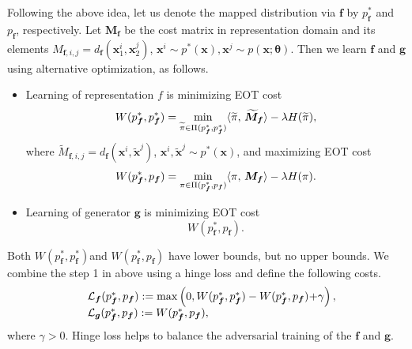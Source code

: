 Following the above idea, let us denote the mapped distribution via $\bm{f}$ by $p^{\ast}_{\bm{f}}$ and $p_{\bm{f}}$, respectively. Let $\bm{M}_{\bm{f}}$ be the cost matrix in representation domain and its elements $M_{\bm{f},{i,j}} = d_{\bm{f}}(\bm{x}^{i}_1, \bm{x}^{j}_2)$, $\bm{x}^{i} \sim p^{\ast}(\bm{x}), \bm{x}^{j}\sim p(\bm{x}; \bm{\theta})$. Then we learn $\bm{f}$ and $\bm{g}$ using alternative optimization, as follows. 
\begin{itemize}
\item Learning of representation $f$ is minimizing EOT cost
  \begin{equation}\label{eq-sim-in}
    W(p^{\ast}_{\bm{f}},p^{\ast}_{\bm{f}}) = \min_{\widetilde{\pi} \in \Pi(p^{\ast}_{\bm{f}}, p^{\ast}_{\bm{f}}) } \langle \widetilde{\pi},\,\widetilde{\bm{M}}_{\bm{f}}\rangle - \lambda H(\widetilde{\pi}),
  \end{equation}
  where $\widetilde{M}_{\bm{f}, {i,j}} = d_{\bm{f}}(\bm{x}^{i}, \tilde{\bm{x}}^{j})$, $\bm{x}^{i}, \tilde{\bm{x}}^{j} \sim p^{\ast}(\bm{x})$, and maximizing EOT cost
  \begin{equation}\label{eq-sim-ex}
    W(p^{\ast}_{\bm{f}}, p_{\bm{f}}) = \min_{{\pi} \in \Pi(p^{\ast}_{\bm{f}}, p_{\bm{f}}) } \dotp{{\pi}}{\bm{M_f}} - \la H({\pi}).\vspace{-8pt}
  \end{equation}
\item Learning of generator $\bm{g}$ is minimizing EOT cost
  \begin{equation}
    W(p^{\ast}_{\bm{f}}, p_{\bm{f}}).
  \end{equation}
\end{itemize} 
Both $W(p^{\ast}_{\bm{f}}, p^{\ast}_{\bm{f}})$and $W(p^{\ast}_{\bm{f}}, p_{\bm{f}})$ have lower bounds, but no upper bounds. 
We combine the step 1 in above using a hinge loss and define the following costs.
\begin{equation}
  \begin{array}{rl}
    &\mathcal{L}_{\bm{f}}(p^{\ast}_{\bm{f}}, p_{\bm{f}}) := \max\left(0, W(p^{\ast}_{\bm{f}}, p^{\ast}_{\bm{f}})- W(p^{\ast}_{\bm{f}}, p_{\bm{f}}) \hspace{-2pt}+\hspace{-2pt} \gamma \right),\\
    &\mathcal{L}_{\bm{g}}(p^{\ast}_{\bm{f}}, p_{\bm{f}}) := W(p^{\ast}_{\bm{f}}, p_{\bm{f}}),
  \end{array}
\end{equation}
where $\gamma>0$. Hinge loss helps to balance the adversarial training of the $\bm{f}$ and $\bm{g}$.
